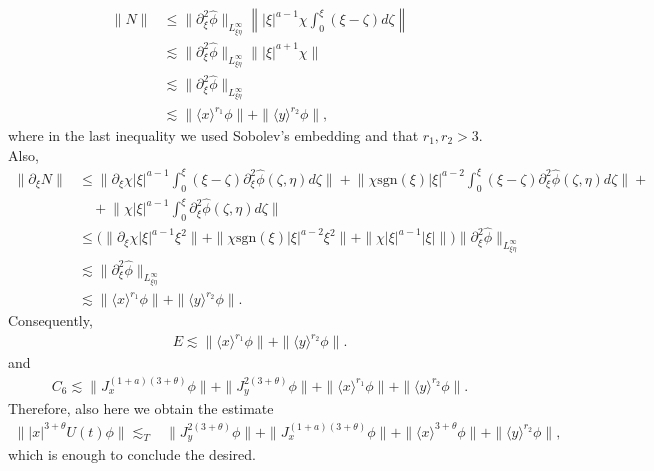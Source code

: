 \documentclass[reqno]{amsart}
\newcommand{\lanx}{\langle x \rangle}
\newcommand{\lany}{\langle y \rangle}
\newcommand{\p}{\partial}
\newcommand{\sgn}{\text{sgn}}
\numberwithin{equation}{section}
\begin{document}
\begin{equation*}
\begin{split}%
\|N\|
                            &\leq \|\partial_\xi^2 \hat{\phi}\|_{L^{\infty}_{\xi\eta}} \left\| |\xi|^{a-1}\chi\int_0^\xi (\xi-\zeta)d\zeta\right \|\\
                            &\lesssim \|\partial_\xi^2 \hat{\phi}\|_{L^{\infty}_{\xi\eta}} \||\xi|^{a+1}\chi \|\\
                            &\lesssim  \|\partial_\xi^2 \hat{\phi}\|_{L^\infty_{\xi \eta}}\\
                            &\lesssim \|\lanx^{r_1}\phi\|+\|\langle y \rangle^{r_2}\phi\|,
\end{split}
\end{equation*}
where in the last inequality we used Sobolev's embedding and that $r_1,r_2>3$.
Also,
\begin{equation*}
\begin{split}%
\|\partial_\xi N\|&\leq \Big\| \partial_\xi \chi|\xi|^{a-1}\int_0^\xi (\xi-\zeta)\partial_\xi^2 \hat{\phi}(\zeta,\eta)d\zeta \Big\|+
                     \Big\|\chi \sgn(\xi) |\xi|^{a-2}\int_0^\xi (\xi-\zeta)\partial_\xi^2 \hat{\phi}(\zeta,\eta)d\zeta \Big\|+\\
                    &\quad +\Big\|\chi |\xi|^{a-1}\int_0^\xi \partial_\xi^2 \hat{\phi}(\zeta,\eta)d\zeta \Big\|\\
                            &\leq \Big(\| \p_\xi\chi|\xi|^{a-1}\xi^2 \|+\|\chi \sgn(\xi)|\xi|^{a-2}\xi^2\|+\|\chi |\xi|^{a-1}|\xi|\|\Big)\|\partial_\xi^2 \hat{\phi}\|_{L^{\infty}_{\xi\eta}}\\
                            &\lesssim  \|\partial_\xi^2 \hat{\phi}\|_{L^{\infty}_{\xi\eta}}\\
                            &\lesssim \|\lanx^{r_1}\phi\|+\|\langle y \rangle^{r_2}\phi\|.
\end{split}
\end{equation*}
Consequently,
\begin{equation*}
\begin{split}
E\lesssim \|\lanx^{r_1}\phi\|+\|\langle y \rangle^{r_2}\phi\|.
\end{split}
\end{equation*}
 and 
\begin{equation*}
\begin{split}
C_6 \lesssim  \|J_x^{(1+a)(3+\theta)}\phi\|+\|J_y^{2(3+\theta)}\phi\|+\|\lanx^{r_1}\phi\|+\|\lany^{r_2}\phi\|.
\end{split}
\end{equation*}
Therefore, also here we obtain the estimate
\begin{equation*}
\begin{split}
\||x|^{3+\theta}U(t)\phi\|\lesssim_{T}& \|J_y^{2(3+\theta)}\phi\|+\|J_x^{(1+a)(3+\theta)}\phi\|+\|\lanx^{3+\theta}\phi\|+\|\lany^{r_2}\phi\|,
\end{split}
\end{equation*}
which is enough to conclude the desired.
\end{document}
